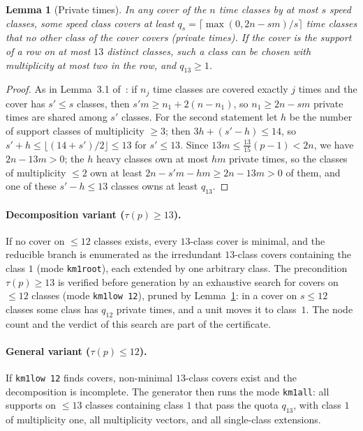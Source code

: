\documentclass[11pt]{article}
\newtheorem{lemma}[theorem]{Lemma}
\theoremstyle{definition}
\theoremstyle{remark}
\begin{document}
\begin{lemma}[Private times]\label{lem:quota}
In any cover of the $n$ time classes by at most $s$ speed classes, some
speed class covers at least $q_s=\lceil\max(0,2n-sm)/s\rceil$ time
classes that no other class of the cover covers (\emph{private} times).
If the cover is the support of a row on at most $13$ distinct classes,
such a class can be chosen with multiplicity at most two in the row, and
$q_{13}\geq1$.
\end{lemma}

\begin{proof}
As in Lemma~3.1 of~\cite{Allikvere26}: if $n_j$ time classes are covered
exactly $j$ times and the cover has $s'\leq s$ classes, then
$s'm\geq n_1+2(n-n_1)$, so $n_1\geq2n-sm$ private times are shared among
$s'$ classes.  For the second statement let $h$ be the number of support
classes of multiplicity $\geq3$; then $3h+(s'-h)\leq14$, so
$s'+h\leq\lfloor(14+s')/2\rfloor\leq13$ for $s'\leq13$.  Since
$13m\leq\frac{13}{15}(p-1)<2n$, we have $2n-13m>0$; the $h$ heavy classes
own at most $hm$ private times, so the classes of multiplicity $\leq2$ own
at least $2n-s'm-hm\geq2n-13m>0$ of them, and one of these $s'-h\leq13$
classes owns at least $q_{13}$.
\end{proof}

\paragraph{Decomposition variant ($\tau(p)\geq13$).}
If no cover on $\leq12$ classes exists, every $13$-class cover is minimal,
and the reducible branch is enumerated as the irredundant $13$-class
covers containing the class $1$ (mode \texttt{km1root}), each extended by
one arbitrary class.  The precondition $\tau(p)\geq13$ is verified before
generation by an exhaustive search for covers on $\leq12$ classes (mode
\texttt{km1low 12}), pruned by Lemma~\ref{lem:quota}: in a cover on
$s\leq12$ classes some class has $q_{12}$ private times, and a unit moves
it to class~$1$.  The node count and the verdict of this search are part
of the certificate.

\paragraph{General variant ($\tau(p)\leq12$).}
If \texttt{km1low 12} finds covers, non-minimal $13$-class covers exist
and the decomposition is incomplete.  The generator then runs the mode
\texttt{km1all}: all supports on $\leq13$ classes containing class $1$
that pass the quota $q_{13}$, with class $1$ of multiplicity one, all
multiplicity vectors, and all single-class extensions.
\end{document}
